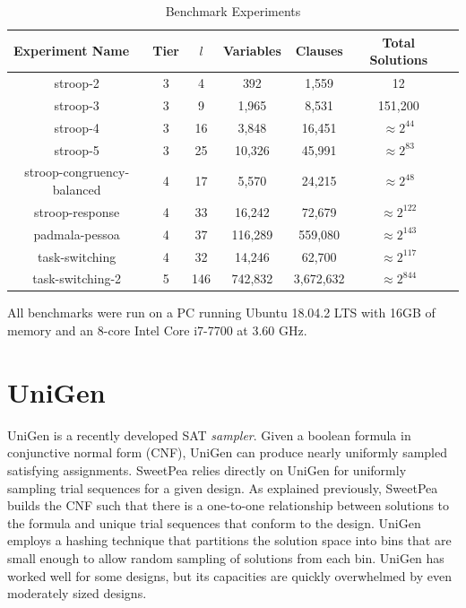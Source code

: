 \begin{table}[htb]
  \centering
  \caption{Benchmark Experiments}
\begin{tabular}{|c|c|c|c|c|c|c|}
\hline
\multicolumn{1}{|l|}{Experiment Name} & Tier            & $l$             & Variables  & Clauses    & Total Solutions    \\ \hline
stroop-2                              & 3               & 4               & 392        & 1,559      & 12                 \\ \hline
stroop-3                              & 3               & 9               & 1,965      & 8,531      & 151,200            \\ \hline
stroop-4                              & 3               & 16              & 3,848      & 16,451     & $\approx 2^{44}$   \\ \hline
stroop-5                              & 3               & 25              & 10,326     & 45,991     & $\approx 2^{83}$   \\ \hline
stroop-congruency-balanced            & 4               & 17              & 5,570      & 24,215     & $\approx 2^{48}$   \\ \hline
stroop-response                       & 4               & 33              & 16,242     & 72,679     & $\approx 2^{122}$  \\ \hline
padmala-pessoa                        & 4               & 37              & 116,289    & 559,080    & $\approx 2^{143}$  \\ \hline
task-switching                        & 4               & 32              & 14,246     & 62,700     & $\approx 2^{117}$  \\ \hline
task-switching-2                      & 5               & 146             & 742,832    & 3,672,632  & $\approx 2^{844}$  \\ \hline
\end{tabular}
\label{tab:benchmark_experiments}
\end{table}

All benchmarks were run on a PC running Ubuntu 18.04.2 LTS with 16GB of memory and an 8-core Intel Core i7-7700 at 3.60 GHz.


\section{UniGen}

UniGen \cite{chakraborty2013scalable,chakraborty_balancing_2014} is a recently developed SAT \textit{sampler}. Given a boolean formula in conjunctive normal form (CNF), UniGen can produce nearly uniformly sampled satisfying assignments. SweetPea relies directly on UniGen for uniformly sampling trial sequences for a given design. As explained previously, SweetPea builds the CNF such that there is a one-to-one relationship between solutions to the formula and unique trial sequences that conform to the design. UniGen employs a hashing technique that partitions the solution space into bins that are small enough to allow random sampling of solutions from each bin. UniGen has worked well for some designs, but its capacities are quickly overwhelmed by even moderately sized designs.

